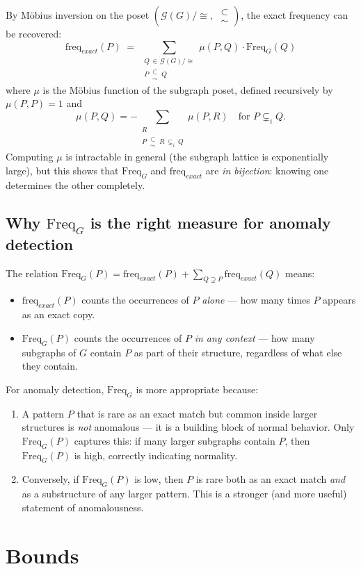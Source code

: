 \documentclass[11pt,a4paper]{article}
\theoremstyle{plain}
\theoremstyle{definition}
\newcommand{\Freq}{\mathrm{Freq}}
\newcommand{\freq}{\mathrm{freq}}
\newcommand{\GG}{\mathcal{G}}
\newcommand\subsetsim{\mathrel{\substack{
  \textstyle\subset\\[-0.2ex]\textstyle\sim}}}
\begin{document}
By M\"obius inversion on the poset $(\GG(G)/{\cong},\; \subsetsim)$, the exact frequency can be recovered:
\[
\freq_{exact}(P) \;=\; \sum_{\substack{Q \,\in\, \GG(G)/{\cong} \\[2pt] P \,\subsetsim\, Q}} \mu(P, Q) \cdot \Freq_G(Q)
\]
where $\mu$ is the M\"obius function of the subgraph poset, defined recursively by $\mu(P, P) = 1$ and
\[
\mu(P, Q) = -\sum_{\substack{R \\[1pt] P \,\subsetsim\, R \,\subsetneq_i\, Q}} \mu(P, R) \quad \text{for } P \subsetneq_i Q.
\]
Computing $\mu$ is intractable in general (the subgraph lattice is exponentially large), but this shows that $\Freq_G$ and $\freq_{exact}$ are \emph{in bijection}: knowing one determines the other completely.

\subsection{Why $\Freq_G$ is the right measure for anomaly detection}

The relation $\Freq_G(P) = \freq_{exact}(P) + \sum_{Q \supsetneq P} \freq_{exact}(Q)$ means:

\begin{itemize}
\item $\freq_{exact}(P)$ counts the occurrences of $P$ \emph{alone} --- how many times $P$ appears as an exact copy.
\item $\Freq_G(P)$ counts the occurrences of $P$ \emph{in any context} --- how many subgraphs of $G$ contain $P$ as part of their structure, regardless of what else they contain.
\end{itemize}

For anomaly detection, $\Freq_G$ is more appropriate because:
\begin{enumerate}
\item A pattern $P$ that is rare as an exact match but common inside larger structures is \emph{not} anomalous --- it is a building block of normal behavior. Only $\Freq_G(P)$ captures this: if many larger subgraphs contain $P$, then $\Freq_G(P)$ is high, correctly indicating normality.

\item Conversely, if $\Freq_G(P)$ is low, then $P$ is rare both as an exact match \emph{and} as a substructure of any larger pattern. This is a stronger (and more useful) statement of anomalousness.
\end{enumerate}

\section{Bounds}
\end{document}
